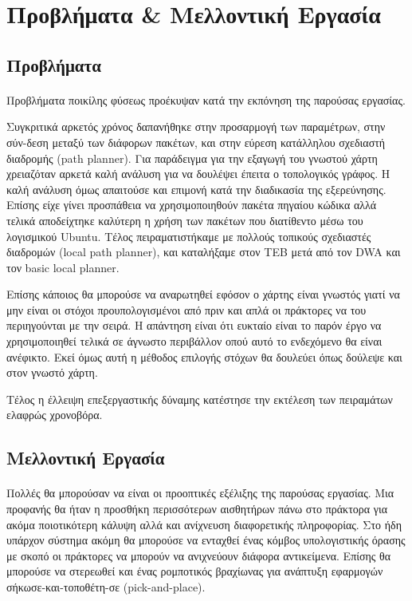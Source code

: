 \section{Προβλήματα \& Μελλοντική Εργασία}

\subsection{Προβλήματα}

\paragraph{}Προβλήματα ποικίλης φύσεως προέκυψαν κατά την εκπόνηση της παρούσας εργασίας. 

Συγκριτικά αρκετός χρόνος δαπανήθηκε στην προσαρμογή των παραμέτρων, στην σύν-δεση μεταξύ των διάφορων πακέτων, και στην εύρεση κατάλληλου σχεδιαστή διαδρομής (path planner). Για παράδειγμα για την εξαγωγή του γνωστού χάρτη χρειαζόταν αρκετά καλή ανάλυση για να δουλέψει έπειτα ο τοπολογικός γράφος. Η καλή ανάλυση όμως απαιτούσε και επιμονή κατά την διαδικασία της εξερεύνησης. Επίσης είχε γίνει προσπάθεια να χρησιμοποιηθούν πακέτα πηγαίου κώδικα αλλά τελικά αποδείχτηκε καλύτερη η χρήση των πακέτων που διατίθεντο μέσω του λογισμικού Ubuntu. Τέλος πειραματιστήκαμε με πολλούς τοπικούς σχεδιαστές διαδρομών (local path planner), και καταλήξαμε στον TEB μετά από τον DWA και τον basic local planner.

Επίσης κάποιος θα μπορούσε να αναρωτηθεί εφόσον ο χάρτης είναι γνωστός γιατί να μην είναι οι στόχοι προυπολογισμένοι από πριν και απλά οι πράκτορες να του περιηγούνται με την σειρά. Η απάντηση είναι ότι ευκταίο είναι το παρόν έργο να χρησιμοποιηθεί τελικά σε άγνωστο περιβάλλον οπού αυτό το ενδεχόμενο θα είναι ανέφικτο. Εκεί όμως αυτή η μέθοδος επιλογής στόχων θα δουλεύει όπως δούλεψε και στον γνωστό χάρτη.

Τέλος η έλλειψη επεξεργαστικής δύναμης κατέστησε την εκτέλεση των πειραμάτων ελαφρώς χρονοβόρα.


\subsection{Μελλοντική Εργασία}

\paragraph{} Πολλές θα μπορούσαν να είναι οι προοπτικές εξέλιξης της παρούσας εργασίας. Μια προφανής θα ήταν η προσθήκη περισσότερων αισθητήρων πάνω στο πράκτορα για ακόμα ποιοτικότερη κάλυψη αλλά και ανίχνευση διαφορετικής πληροφορίας. 
Στο ήδη υπάρχον σύστημα ακόμη θα μπορούσε να ενταχθεί ένας κόμβος υπολογιστικής όρασης με σκοπό οι πράκτορες να μπορούν να ανιχνεύουν διάφορα αντικείμενα. Επίσης θα μπορούσε να στερεωθεί και ένας ρομποτικός βραχίωνας για ανάπτυξη εφαρμογών σήκωσε-και-τοποθέτη-σε (pick-and-place). 

